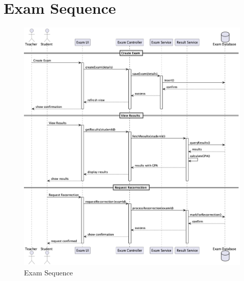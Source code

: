 \documentclass[12pt,a4paper]{report}
\begin{document}
\section{Exam Sequence}
\begin{figure}[htbp]
    \centering
    \includegraphics[width=1\textwidth]{exam-sequence.png}
    \caption{Exam Sequence}
    \label{fig:exam-sequence}
\end{figure}
\end{document}
